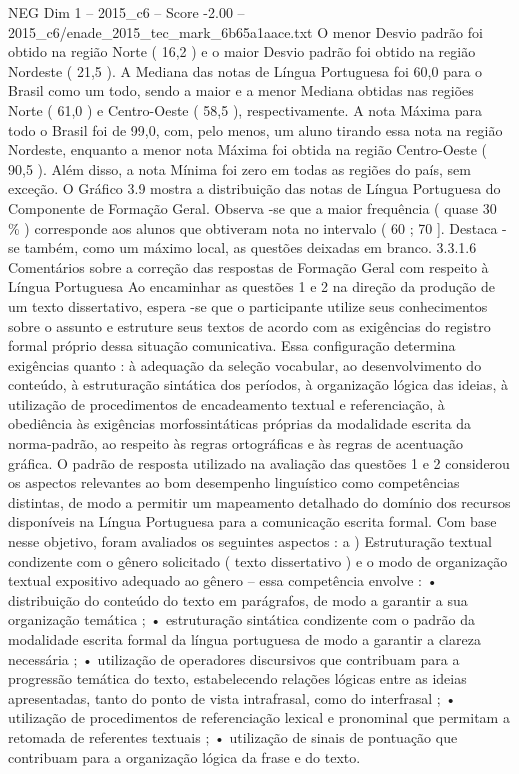 \begin{textsample}{NEG Dim 1 – 2015\_c6 – Score -2.00 – 2015\_c6/enade\_2015\_tec\_mark\_6b65a1aace.txt}
O menor Desvio padrão foi obtido na região Norte ( 16,2 ) e o maior Desvio padrão foi obtido na região Nordeste ( 21,5 ).
A Mediana das notas de Língua Portuguesa foi 60,0 para o Brasil como um todo, sendo a maior e a menor Mediana obtidas nas regiões Norte ( 61,0 ) e Centro-Oeste ( 58,5 ), respectivamente.
A nota Máxima para todo o Brasil foi de 99,0, com, pelo menos, um aluno tirando essa nota na região Nordeste, enquanto a menor nota Máxima foi obtida na região Centro-Oeste ( 90,5 ).
Além disso, a nota Mínima foi zero em todas as regiões do país, sem exceção.
O Gráfico 3.9 mostra a distribuição das notas de Língua Portuguesa do Componente de Formação Geral.
Observa -se que a maior frequência ( quase 30 \% ) corresponde aos alunos que obtiveram nota no intervalo ( 60 ; 70 ].
Destaca -se também, como um máximo local, as questões deixadas em branco. 3.3.1.6 Comentários sobre a correção das respostas de Formação Geral com respeito à Língua Portuguesa Ao encaminhar as questões 1 e 2 na direção da produção de um texto dissertativo, espera -se que o participante utilize seus conhecimentos sobre o assunto e estruture seus textos de acordo com as exigências do registro formal próprio dessa situação comunicativa.
Essa configuração determina exigências quanto : à adequação da seleção vocabular, ao desenvolvimento do conteúdo, à estruturação sintática dos períodos, à organização lógica das ideias, à utilização de procedimentos de encadeamento textual e referenciação, à obediência às exigências morfossintáticas próprias da modalidade escrita da norma-padrão, ao respeito às regras ortográficas e às regras de acentuação gráfica.
O padrão de resposta utilizado na avaliação das questões 1 e 2 considerou os aspectos relevantes ao bom desempenho linguístico como competências distintas, de modo a permitir um mapeamento detalhado do domínio dos recursos disponíveis na Língua Portuguesa para a comunicação escrita formal.
Com base nesse objetivo, foram avaliados os seguintes aspectos : a ) Estruturação textual condizente com o gênero solicitado ( texto dissertativo ) e o modo de organização textual expositivo adequado ao gênero – essa competência envolve : • distribuição do conteúdo do texto em parágrafos, de modo a garantir a sua organização temática ; • estruturação sintática condizente com o padrão da modalidade escrita formal da língua portuguesa de modo a garantir a clareza necessária ; • utilização de operadores discursivos que contribuam para a progressão temática do texto, estabelecendo relações lógicas entre as ideias apresentadas, tanto do ponto de vista intrafrasal, como do interfrasal ; • utilização de procedimentos de referenciação lexical e pronominal que permitam a retomada de referentes textuais ; • utilização de sinais de pontuação que contribuam para a organização lógica da frase e do texto.

\end{textsample}
